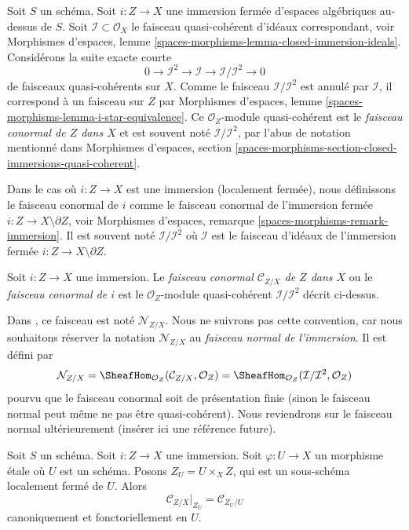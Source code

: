 \noindent
Soit $S$ un schéma. Soit $i : Z \to X$ une immersion fermée d'espaces algébriques
au-dessus de $S$. Soit $\mathcal{I} \subset \mathcal{O}_X$ le
faisceau quasi-cohérent d'idéaux correspondant, voir
Morphismes d'espaces,
lemme \ref{spaces-morphisms-lemma-closed-immersion-ideals}.
Considérons la suite exacte courte
$$
0 \to \mathcal{I}^2 \to \mathcal{I} \to \mathcal{I}/\mathcal{I}^2 \to 0
$$
de faisceaux quasi-cohérents sur $X$. Comme le faisceau $\mathcal{I}/\mathcal{I}^2$
est annulé par $\mathcal{I}$, il correspond à un faisceau sur $Z$ par
Morphismes d'espaces, lemme \ref{spaces-morphisms-lemma-i-star-equivalence}.
Ce $\mathcal{O}_Z$-module quasi-cohérent est le
{\it faisceau conormal de $Z$ dans $X$} et est souvent noté
$\mathcal{I}/\mathcal{I}^2$, par l'abus de notation mentionné dans
Morphismes d'espaces,
section \ref{spaces-morphisms-section-closed-immersions-quasi-coherent}.

\medskip\noindent
Dans le cas où $i : Z \to X$ est une immersion (localement fermée), nous définissons le
faisceau conormal de $i$ comme le faisceau conormal de l'immersion fermée
$i : Z \to X \setminus \partial Z$, voir
Morphismes d'espaces, remarque \ref{spaces-morphisms-remark-immersion}.
Il est souvent noté
$\mathcal{I}/\mathcal{I}^2$ où $\mathcal{I}$ est le faisceau d'idéaux
de l'immersion fermée $i : Z \to X \setminus \partial Z$.

\begin{definition}
\label{definition-conormal-sheaf}
Soit $i : Z \to X$ une immersion. Le {\it faisceau conormal
$\mathcal{C}_{Z/X}$ de $Z$ dans $X$} ou le {\it faisceau conormal de $i$}
est le $\mathcal{O}_Z$-module quasi-cohérent $\mathcal{I}/\mathcal{I}^2$
décrit ci-dessus.
\end{definition}

\noindent
Dans \cite[IV, définition 16.1.2]{EGA}, ce faisceau est noté
$\mathcal{N}_{Z/X}$. Nous ne suivrons pas cette convention, car nous
souhaitons réserver la notation $\mathcal{N}_{Z/X}$
au {\it faisceau normal de l'immersion}. Il est défini par
$$
\mathcal{N}_{Z/X} =
\SheafHom_{\mathcal{O}_Z}(\mathcal{C}_{Z/X}, \mathcal{O}_Z) =
\SheafHom_{\mathcal{O}_Z}(\mathcal{I}/\mathcal{I}^2, \mathcal{O}_Z)
$$
pourvu que le faisceau conormal soit de présentation finie (sinon le
faisceau normal peut même ne pas être quasi-cohérent). Nous reviendrons sur le
faisceau normal ultérieurement (insérer ici une référence future).

\begin{lemma}
\label{lemma-etale-conormal}
Soit $S$ un schéma. Soit $i : Z \to X$ une immersion.
Soit $\varphi : U \to X$ un morphisme \'etale où $U$ est un schéma.
Posons $Z_U = U \times_X Z$, qui est un sous-schéma localement fermé de $U$.
Alors
$$
\mathcal{C}_{Z/X}|_{Z_U} = \mathcal{C}_{Z_U/U}
$$
canoniquement et fonctoriellement en $U$.
\end{lemma}

